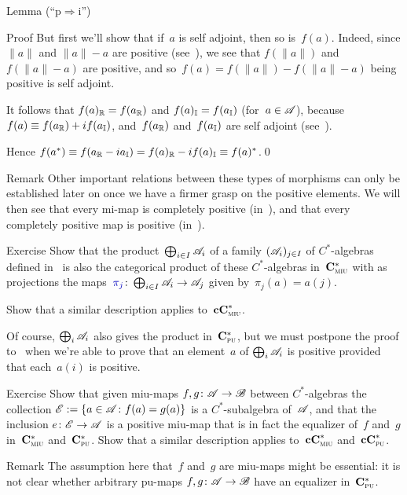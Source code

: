 \documentclass[a]{subfiles}
\begin{document}
\begin{parsec}
\begin{point}{Lemma (``p$\Rightarrow$i'')}
\begin{point}{Proof}
But first we'll show that if~$a$ is self adjoint,
then so is~$f(a)$.
Indeed, since $\|a\|$ and $\|a\|-a$ are positive (see~),
we see that $f(\|a\|)$ and $f(\|a\|-a)$ are positive,
and so~$f(a)=f(\|a\|)-f(\|a\|-a)$ being positive is self adjoint.

It follows that $f(a)_{\mathbb{R}}=f(a_{\mathbb{R}})$
and $f(a)_{\mathbb{I}}=f(a_{\mathbb{I}})$ (for~$a\in\mathscr{A}$),
because $f(a)\equiv f(a_{\mathbb{R}})+if(a_{\mathbb{I}})$,
and~$f(a_{\mathbb{R}})$ and~$f(a_{\mathbb{I}})$
are self adjoint
(see~).

Hence $f(a^*)\equiv f(a_{\mathbb{R}}-ia_{\mathbb{I}})
=f(a)_{\mathbb{R}}-if(a)_{\mathbb{I}}\equiv f(a)^*$.\qed
\end{point}
\end{point}
\begin{point}{Remark}%
Other important relations between these types of morphisms
can only be established later on
once we have a firmer grasp on the positive elements.
We will then see  
that every mi-map 
is completely positive (in~),
and that every completely positive map is positive 
(in~).
\end{point}
\begin{point}{Exercise}%
Show that
the product~$\bigoplus_{i\in I}\mathscr{A}_i$
of
a family $(\mathscr{A}_i)_{j\in I}$
of $C^*$-algebras
defined in~
is also the categorical product 
of these $C^*$-algebras
in~$\mathbf{C}^*_{\text{\textsc{miu}}}$
with as projections
the maps~$\Define{\pi_j}\colon \bigoplus_{i \in I}\scrA_i\to\scrA_j$%
given by~$\pi_j(a)=a(j)$.

Show that a similar description applies to~$\mathbf{cC}^*_{\text{\textsc{miu}}}$.

Of course,
$\bigoplus_i\mathscr{A}_i$
also gives the product in~$\mathbf{C}^*_{\text{\textsc{pu}}}$,
but we must postpone the proof
to~
when we're able to prove
that an element~$a$ of $\bigoplus_i \mathscr{A}_i$
is positive provided that each~$a(i)$ is positive.
\end{point}
\begin{point}{Exercise}%
Show that given miu-maps $f,g\colon \mathscr{A}\to\mathscr{B}$
between $C^*$-algebras
the collection $\mathscr{E}:=\{a\in\mathscr{A}\colon f(a)=g(a)\}$
is a $C^*$-subalgebra
of~$\mathscr{A}$,
and that the inclusion $e\colon \mathscr{E}\to\mathscr{A}$
is a positive miu-map
that is in fact the equalizer of~$f$ and~$g$
in~$\mathbf{C}^*_{\text{\textsc{miu}}}$ and~$\mathbf{C}^*_{\text{\textsc{pu}}}$.
Show that a similar description applies
to~$\mathbf{cC}^*_{\text{\textsc{miu}}}$ and~$\mathbf{cC}^*_{\text{\textsc{pu}}}$.
\begin{point}{Remark}%
The assumption here that~$f$ and~$g$ are miu-maps
might be essential:
it is not clear whether arbitrary pu-maps $f,g\colon \mathscr{A}\to\mathscr{B}$
have an equalizer in~$\mathbf{C}^*_{\text{\textsc{pu}}}$.
\end{point}
\end{point}
\end{parsec}
\end{document}
